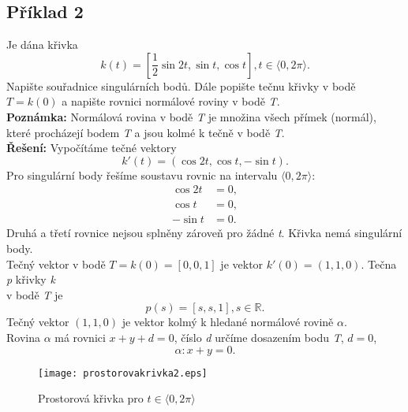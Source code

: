 \subsection*{Příklad 2}
Je dána křivka
$$k(t) = \left[\frac{1}{2}\sin{2t}, \sin{t}, \cos{t}\right], t \in \langle0, 2\pi\rangle.$$
Napište souřadnice singulárních bodů. Dále popište tečnu křivky v bodě $T=k\left(0\right)$
a napište rovnici normálové roviny v bodě \textit{T}. \\
\textbf{Poznámka:} Normálová rovina v bodě \textit{T} je množina všech přímek (normál), které procházejí
bodem \textit{T} a jsou kolmé k tečně v bodě \textit{T}. \\[10pt]
\textbf{Řešení:} Vypočítáme tečné vektory
$$k'(t)=(\cos{2t}, \cos{t}, -\sin{t}).$$
Pro singulární body řešíme soustavu rovnic na intervalu $\langle0,2\pi\rangle$:
\begin{align*}
	\cos{2t} & = 0, \\
	\cos{t}  & = 0, \\
	-\sin{t} & = 0. 
\end{align*}
Druhá a třetí rovnice nejsou splněny zároveň pro žádné \textit{t}. Křivka nemá singulární body. \\
Tečný vektor v bodě $T=k(0)=[0,0,1]$ je vektor $k'(0)=(1,1,0)$.
Tečna \textit{p} křivky \textit{k}\\ v bodě \textit{T} je
$$p(s)=[s,s,1], s \in \mathbb{R}.$$
Tečný vektor $(1,1,0)$ je vektor kolmý k hledané normálové rovině $\alpha$. \\
Rovina $\alpha$ má rovnici $x+y+d=0$, číslo \textit{d} určíme dosazením bodu \textit{T}, $d=0$, 
$$\alpha: x+y=0.$$
\begin{figure}[ht!]
	\centering
	\texttt{[image: prostorovakrivka2.eps]}
	\caption{Prostorová křivka  pro $t \in \langle0, 2\pi\rangle$}
	\label{overflow}
\end{figure}
\clearpage

